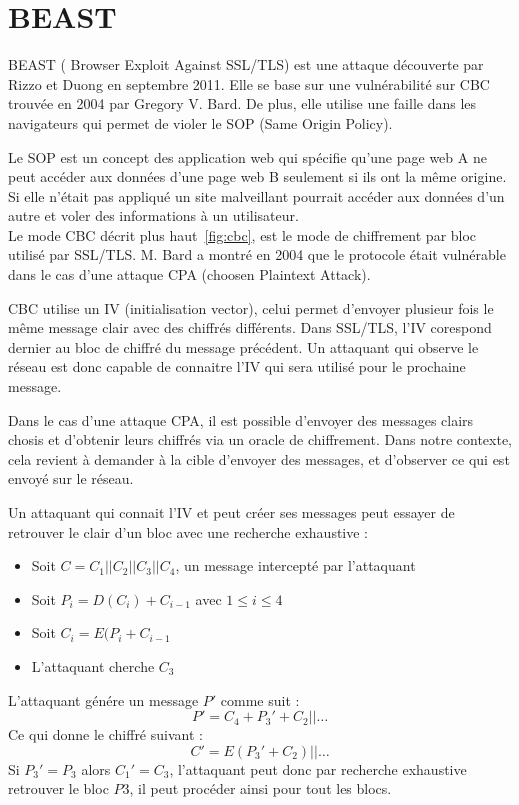\chapter{BEAST}
\label{chapter:Beast}

BEAST ( Browser Exploit Against SSL/TLS) est une attaque  découverte par Rizzo et Duong en septembre 2011.
Elle se base sur une vulnérabilité sur CBC trouvée en 2004 par Gregory V. Bard. De plus, elle utilise une faille dans les
navigateurs qui permet de violer le SOP (Same Origin Policy).

Le SOP est un concept des application web qui spécifie qu'une page web A ne peut accéder aux données d'une page web
B seulement si ils ont la même origine. Si elle n'était pas appliqué un site malveillant pourrait accéder aux
données d'un autre et voler des informations à un utilisateur.\\

Le mode CBC décrit plus haut~\ref{fig:cbc}, est le mode de chiffrement par bloc utilisé par SSL/TLS. 
M. Bard a montré en 2004 que le protocole était vulnérable dans le cas d'une attaque CPA (choosen Plaintext Attack).

CBC utilise un IV (initialisation vector), celui permet d'envoyer plusieur fois le même message clair
avec des chiffrés différents. Dans SSL/TLS, l'IV corespond dernier au bloc de chiffré du message précédent.
Un attaquant qui observe le réseau est donc capable de connaitre l'IV qui sera utilisé pour le prochaine message.

Dans le cas d'une attaque CPA, il est possible d'envoyer des messages clairs chosis et d'obtenir leurs chiffrés
via un oracle de chiffrement. Dans notre contexte, cela revient à demander à la cible d'envoyer des messages, et
d'observer ce qui est envoyé sur le réseau.

Un attaquant qui connait l'IV et peut créer ses messages peut essayer de retrouver le clair d'un bloc avec une 
recherche exhaustive :

\begin{itemize}
\item Soit $C = C_1 || C_2 || C_3 || C_4$, un message intercepté par l'attaquant
\item Soit $P_i = D(C_i) + C_{i-1}$ avec $1 \leq i \leq 4$ 
\item Soit $C_i = E(P_i + C_{i-1} $
\item L'attaquant cherche $C_3$
\end{itemize}

L'attaquant génére un message $P'$ comme suit :
\[ P' = C_4 + P_3' + C_2 || \dots\]
Ce qui donne le chiffré suivant :
\[ C' = E(P_3' + C_2) || \dots \]
Si $P_3' = P_3 $ alors $C_1' = C_3$, l'attaquant peut donc par recherche exhaustive retrouver le bloc $P3$, il peut
procéder ainsi pour tout les blocs. 

